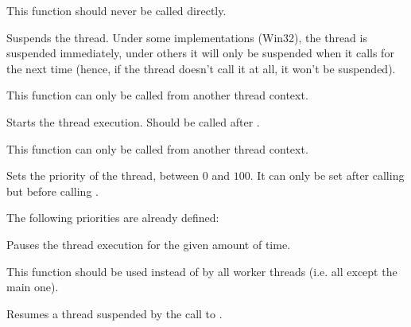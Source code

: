 This function should never be called directly.

\label{wxthreadpause}


Suspends the thread. Under some implementations (Win32), the thread is
suspended immediately, under others it will only be suspended when it calls 
 for the next time (hence, if the
thread doesn't call it at all, it won't be suspended).

This function can only be called from another thread context.

\label{wxthreadrun}


Starts the thread execution. Should be called after 
.

This function can only be called from another thread context.

\label{wxthreadsetpriority}


Sets the priority of the thread, between $0$ and $100$. It can only be set
after calling  but before calling 
.

The following priorities are already defined:

\twocolwidtha{7cm}
\begin{twocollist}\itemsep=0pt
\end{twocollist}

\label{wxthreadsleep}


Pauses the thread execution for the given amount of time.

This function should be used instead of  by all worker
threads (i.e. all except the main one).

\label{wxthreadresume}


Resumes a thread suspended by the call to .

